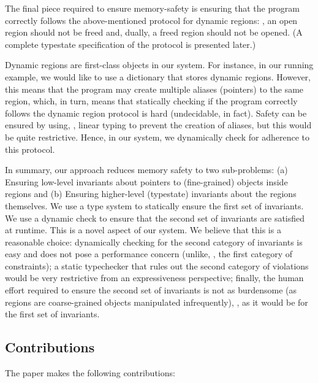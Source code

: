 The final piece required to ensure memory-safety is ensuring that the
program correctly follows the above-mentioned protocol for dynamic
regions: \eg, an open region should not be freed and, dually, a freed
region should not be opened.  (A complete typestate specification of
the protocol is presented later.)

Dynamic regions are first-class objects in our system. For instance,
in our running example, we would like to use a dictionary that stores
dynamic regions. However, this means that the program may create
multiple aliases (pointers) to the same region, which, in turn, means
that statically checking if the program correctly follows the dynamic
region protocol is hard (undecidable, in fact). Safety can be ensured
by using, \eg, linear typing to prevent the creation of aliases, but
this would be quite restrictive. Hence, in our system, we dynamically
check for adherence to this protocol.

In summary, our approach reduces memory safety to two sub-problems:
(a) Ensuring  low-level invariants about pointers to (fine-grained)
objects inside regions and (b) Ensuring higher-level (typestate)
invariants about the regions themselves.  We use a type system to
statically ensure the first set of invariants. We use a dynamic check
to ensure that the second set of invariants are satisfied at runtime.
%
This is a novel aspect of our system. We believe that this is a
reasonable choice: dynamically checking for the second category of
invariants is easy and does not pose a performance concern (unlike,
\eg, the first category of constraints); a static typechecker that
rules out the second category of violations would be very restrictive
from an expressiveness perspective; finally, the human effort required
to ensure the second set of invariants is not as burdensome (as
regions are coarse-grained objects manipulated infrequently), \eg, as
it would be for the first set of invariants.

\subsection*{Contributions}

The paper makes the following contributions:

